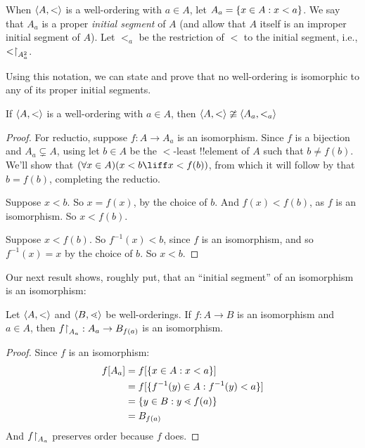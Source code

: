 \documentclass[../../../include/open-logic-section]{subfiles}
\begin{document}
\begin{defn}
When $\langle A, < \rangle$ is a well-ordering with $a \in A$, let $A_a = \{ x \in A : x
< a \}$. We say that $A_a$ is a proper \emph{initial segment} of $A$ (and allow that $A$ itself is an improper initial segment of $A$). Let
$<_a$ be the restriction of $<$ to the initial segment, i.e.,
$\mathord{<}\mathord{\restriction}_{A_a^2}$. 
\end{defn}
\noindent
Using this notation, we can state and prove that no well-ordering is
isomorphic to any of its proper initial segments.

\begin{lem}
If $\langle A, < \rangle$ is a well-ordering with $a \in A$, then
$\langle A, < \rangle \ncong \langle A_a, <_a \rangle$ 
\end{lem}

\begin{proof}
For reductio, suppose $f \colon A \to A_a$ is an isomorphism. Since
$f$ is a bijection and $A_a \subsetneq A$, using  let $b \in A$ be the
$<$-least !!{element} of $A$ such that $b \neq f(b)$. We'll show that
$(\forall x \in A)(x<b \liff x < f(b))$, from which it will follow by
 that $b =
f(b)$, completing the reductio.

Suppose $x < b$. So $x = f(x)$, by the choice of $b$. And $f(x) <
f(b)$, as $f$ is an isomorphism. So $x < f(b)$.

Suppose $x < f(b)$. So $f^{-1}(x) < b$, since $f$ is an isomorphism,
and so $f^{-1}(x) = x$ by the choice of $b$. So $x < b$. 
\end{proof}

Our next result shows, roughly put, that an ``initial segment'' of an
isomorphism is an isomorphism:

\begin{lem}
Let $\langle A, < \rangle$ and $\langle B, \lessdot \rangle$ be well-orderings. If $f
\colon A \to B$ is an isomorphism and $a \in A$, then
$f\mathord{\restriction}_{A_{a}} : A_a \to B_{f(a)}$ is an isomorphism.
\end{lem}

\begin{proof}
Since $f$ is an isomorphism:
\begin{align*}
	f[A_a] &= f[\{ x \in A : x < a \}]\\
	&= f[\{ f^{-1}(y) \in A : f^{-1}(y) < a \}] \\
	&= \{ y \in B : y \lessdot f(a) \} \\
	&=B_{f(a)} 
\end{align*}
And $f\mathord{\restriction}_{A_a}$ preserves order because $f$ does. 
\end{proof}
\end{document}
